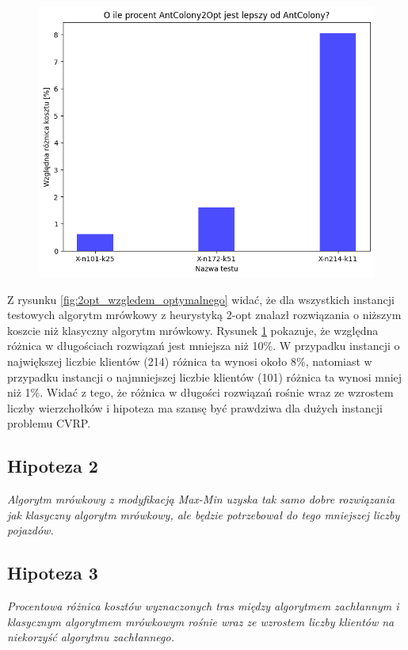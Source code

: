 \documentclass{article}
\begin{document}
\begin{figure}[H]
\begin{minipage}{0.48\textwidth}
        \includegraphics[width=\linewidth]{img/2opt_wzgledem_zwyklego.png}
        \label{fig:2opt_wzgledem_zwyklego}
    \end{minipage}
\end{figure}
\noindent Z rysunku \ref{fig:2opt_wzgledem_optymalnego} widać, że dla wszystkich instancji testowych algorytm mrówkowy z heurystyką 2-opt znalazł rozwiązania o niższym koszcie niż klasyczny algorytm mrówkowy. Rysunek \ref{fig:2opt_wzgledem_zwyklego} pokazuje, że względna różnica w długościach rozwiązań jest mniejsza niż 10\%. W przypadku instancji o największej liczbie klientów (214) różnica ta wynosi około 8\%, natomiast w przypadku instancji o najmniejszej liczbie klientów (101) różnica ta wynosi mniej niż 1\%. Widać z tego, że różnica w długości rozwiązań rośnie wraz ze wzrostem liczby wierzchołków i hipoteza ma szansę być prawdziwa dla dużych instancji problemu CVRP.

\subsection{Hipoteza 2}
\textit{Algorytm mrówkowy z modyfikacją Max-Min uzyska tak samo dobre rozwiązania jak klasyczny algorytm mrówkowy, ale będzie potrzebował do tego mniejszej liczby pojazdów.}

\subsection{Hipoteza 3}
\textit{Procentowa różnica kosztów wyznaczonych tras między algorytmem zachłannym i klasycznym algorytmem mrówkowym rośnie wraz ze wzrostem liczby klientów na niekorzyść algorytmu zachłannego.}
\end{document}
